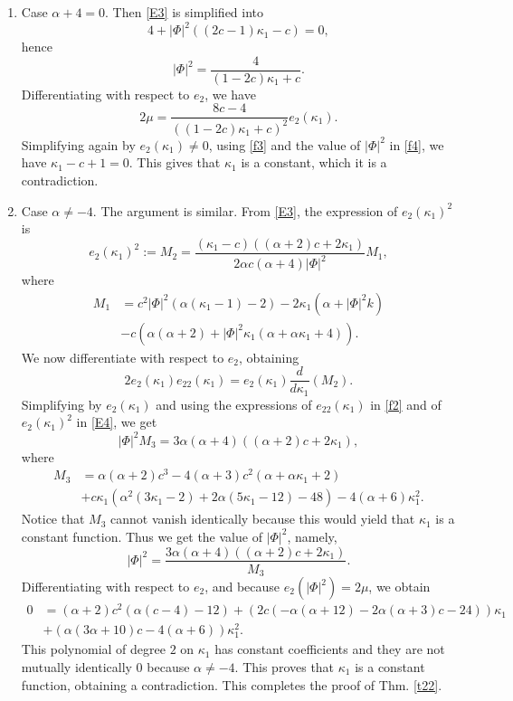 \documentclass[a4paper,12pt]{amsart}
\theoremstyle{definition}
\begin{document}
\begin{enumerate}
\item Case $\alpha+4=0$. Then  \eqref{E3} is simplified  into
 $$4+|\Phi|^2 ( (2c-1)\kappa_1-c)=0,$$
 hence 
 \begin{equation}\label{f4}
 |\Phi|^2=\frac{4}{(1-2c)\kappa_1+c}.
 \end{equation}
 Differentiating with respect to $e_2$, we have 
 $$2\mu=\frac{8c-4}{((1-2c)\kappa_1+c)^2}e_2(\kappa_1).$$
 Simplifying again by $e_2(\kappa_1)\not=0$, using \eqref{f3} and the value of $|\Phi|^2$ in \eqref{f4}, we have $\kappa_1-c+1=0$. This gives that $\kappa_1 $ is a constant, which it is a contradiction. 
 \item Case $\alpha\not=-4$. The argument   is  similar. From \eqref{E3}, the expression of $e_2(\kappa_1)^2$ is  
\begin{equation}\label{E4}
e_2(\kappa_1)^2:=M_2=\frac{(\kappa_1-c)((\alpha +2) c+2 \kappa_1)}{2 \alpha c  (\alpha +4)   |\Phi|^2}M_1,
\end{equation}
 where
\begin{equation*}
\begin{split}
M_1&=   c^2 |\Phi|^2 (\alpha  (\kappa_1-1)-2)-2 \kappa_1 \left(\alpha +|\Phi|^2 k\right) \\
&-c \left(\alpha  (\alpha +2)+|\Phi|^2\kappa_1 (\alpha +\alpha  \kappa_1+4)\right).
\end{split}
\end{equation*}
We now differentiate with respect to $e_2$, obtaining
$$2e_2(\kappa_1)e_{22}(\kappa_1)=e_2(\kappa_1)\frac{d}{d\kappa_1}(M_2).$$
Simplifying by $e_2(\kappa_1)$ and using the expressions of $e_{22}(\kappa_1)$ in \eqref{f2} and of $e_2(\kappa_1)^2$ in \eqref{E4},   we get 
$$|\Phi|^2M_3= 3 \alpha  (\alpha +4) ((\alpha +2) c+2 \kappa_1),$$
where 
\begin{equation*}
\begin{split}
M_3&=\alpha  (\alpha +2) c^3-4 (\alpha +3) c^2 (\alpha +\alpha  \kappa_1+2)\\
&+c \kappa_1 \left(\alpha ^2 (3 \kappa_1-2)+2 \alpha  (5 \kappa_1-12)-48\right)-4 (\alpha +6) \kappa_1^2.
\end{split}
\end{equation*}
Notice that $M_3$ cannot vanish identically because this would yield that $\kappa_1$ is a constant function. Thus we get the value of $|\Phi|^2$, namely,
$$|\Phi|^2=\frac{3 \alpha  (\alpha +4) ((\alpha +2) c+2 \kappa_1)}{M_3}.$$
Differentiating with respect to $e_2$, and because $e_2(|\Phi|^2)=2\mu$, we obtain 
\begin{equation*}
\begin{split}
0&=(\alpha +2) c^2 (\alpha  (c-4)-12)+\left(2 c (-\alpha  (\alpha +12)-2 \alpha  (\alpha +3) c-24)\right)\kappa_1\\
&+\left(\alpha  (3 \alpha +10) c-4 (\alpha +6)\right)\kappa_1^2.
\end{split}
\end{equation*}
This polynomial of degree $2$ on $\kappa_1$ has constant coefficients and they are not mutually identically $0$ because $\alpha\not=-4$. This proves that $\kappa_1$ is a constant function, obtaining a contradiction. This completes the proof of Thm. \ref{t22}.
 \end{enumerate}
\end{document}
